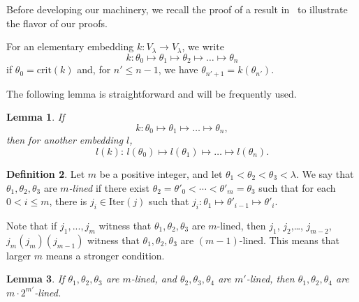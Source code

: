 \documentclass{article}
\newtheorem{lemma}{Lemma}[section]
\theoremstyle{definition}
\newtheorem{definition}[lemma]{Definition}
\theoremstyle{remark}
\begin{document}
Before developing our machinery, we recall the proof of a result in~\cite{Dougherty} to illustrate the flavor of our proofs.

For an elementary embedding \( k : V_\lambda \to V_\lambda \), we write
\[
k : \theta_0 \mapsto \theta_1 \mapsto \theta_2 \mapsto \dots \mapsto \theta_n
\]
if \(\theta_0 = \mathrm{crit}(k)\) and, for \(n' \le n-1\), we have \(\theta_{n'+1} = k(\theta_{n'})\).

The following lemma is straightforward and will be frequently used.

\begin{lemma}\label{lem:l_k_application}
  If
\[
k : \theta_0 \mapsto \theta_1 \mapsto \dots \mapsto \theta_n,
\]
then for another embedding \(l\),
\[
l(k) : \, l(\theta_0) \mapsto l(\theta_1) \mapsto \dots \mapsto l(\theta_n).
\]
\end{lemma}

\begin{definition} \label{def:m-lined}
  Let $m$ be a positive integer, and let $\theta_1 < \theta_2 < \theta_3 < \lambda$. We say that $\theta_1, \theta_2, \theta_3$ are \textit{$m$-lined} if there exist $\theta_2 = \theta'_0 < \cdots < \theta'_{m} = \theta_3$ such that for each $0 < i \le m$, there is $j_i \in \mathrm{Iter}(j)$ such that $j_i: \theta_1 \mapsto \theta'_{i-1} \mapsto \theta'_{i}$.
\end{definition}

Note that if $j_1,...,j_{m}$ witness that $\theta_1,\theta_2,\theta_3$ are $m$-lined, then $j_1$, $j_2$,\dots, $j_{m-2}$, $j_m(j_m)(j_{m-1})$ witness that $\theta_1,\theta_2,\theta_3$ are $(m-1)$-lined. This means that larger $m$ means a stronger condition.

\begin{lemma}\label{lem:lined_composition}
  If $\theta_1,\theta_2,\theta_3$ are $m$-lined, and $\theta_2,\theta_3,\theta_4$ are $m'$-lined, then $\theta_1,\theta_2,\theta_4$ are $m\cdot 2^{m'}$-lined.
\end{lemma}
\end{document}
